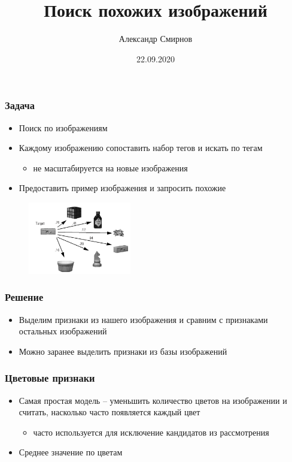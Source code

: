 \documentclass[xetex,mathserif,serif]{beamer}
\title{Поиск похожих изображений}
\author[Александр Смирнов]{Александр Смирнов}
\date{22.09.2020}
\begin{document}
\begin{frame}
	\titlepage{}
\end{frame}


\begin{frame}
	\frametitle{Задача}

	\begin{itemize}
		\item Поиск по изображениям
		\item Каждому изображению сопоставить набор тегов и искать по тегам
		      \begin{itemize}
			      \item не масштабируется на новые изображения
		      \end{itemize}
		\item Предоставить пример изображения и запросить похожие
	\end{itemize}

	\begin{figure}[b]
		\includegraphics[width=0.4\textwidth]{./images/query_sample.png}
		\centering
	\end{figure}
\end{frame}


\begin{frame}
	\frametitle{Решение}

	\begin{itemize}
		\item Выделим признаки из нашего изображения и сравним с признаками остальных изображений
		\item Можно заранее выделить признаки из базы изображений
	\end{itemize}
\end{frame}


\begin{frame}
	\frametitle{Цветовые признаки}

	\begin{itemize}
		\item Самая простая модель -- уменьшить количество цветов на изображении и считать, насколько часто появляется каждый цвет
		      \begin{itemize}
			      \item часто используется для исключение кандидатов из рассмотрения
		      \end{itemize}
		\item Среднее значение по цветам
	\end{itemize}
\end{frame}
\end{document}
